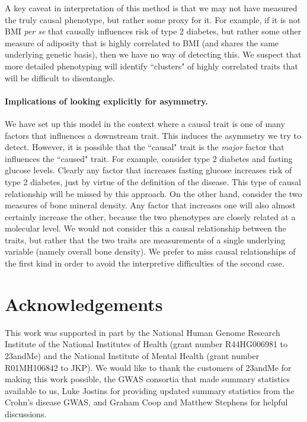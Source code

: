 \documentclass[11pt,titlepage]{article}
\begin{document}
A key caveat in interpretation of this method is that we may not have measured the truly causal phenotype, but rather some proxy for it. For example, if it is not BMI \emph{per se} that causally influences risk of type 2 diabetes, but rather some other measure of adiposity that is highly correlated to BMI (and shares the same underlying genetic basis), then we have no way of detecting this. We suspect that more detailed phenotyping will identify ``clusters" of highly correlated traits that will be difficult to disentangle.  

\paragraph{Implications of looking explicitly for asymmetry.}

We have set up this model in the context where a causal trait is one of many factors that influences a downstream trait. This induces the asymmetry we try to detect. However, it is possible that the ``causal" trait is the \emph{major} factor that influences the ``caused" trait. For example, consider type 2 diabetes and fasting glucose levels. Clearly any factor that increases fasting glucose increases risk of type 2 diabetes, just by virtue of the definition of the disease. This type of causal relationship will be missed by this approach. On the other hand, consider the two measures of bone mineral density. Any factor that increases one will also almost certainly increase the other, because the two phenotypes are closely related at a molecular level. We would not consider this a causal relationship between the traits, but rather that the two traits are measurements of a single underlying variable (namely overall bone density). We prefer to miss causal relationships of the first kind in order to avoid the interpretive difficulties of the second case.
\section{Acknowledgements}
This work was supported in part by the National Human Genome Research Institute of the National Institutes of Health (grant number R44HG006981 to 23andMe) and the National Institute of Mental Health (grant number R01MH106842 to JKP). We would like to thank the customers of 23andMe for making this work possible, the GWAS consortia that made summary statistics available to us, Luke Jostins for providing updated summary statistics from the Crohn's disease GWAS, and Graham Coop and Matthew Stephens for helpful discussions.


\end{document}
